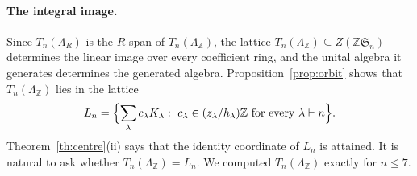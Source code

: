 \documentclass[11pt,a4paper]{article}
\theoremstyle{definition}
\newcommand{\Sn}{\mathfrak S}
\newcommand{\Z}{\mathbb Z}
\begin{document}
\paragraph{The integral image.} Since $T_n(\Lambda_R)$ is the $R$-span of $T_n(\Lambda_\Z)$, the lattice $T_n(\Lambda_\Z)\subseteq Z(\Z\Sn_n)$ determines the linear image over every coefficient ring, and the unital algebra it generates determines the generated algebra. Proposition~\ref{prop:orbit} shows that $T_n(\Lambda_\Z)$ lies in the lattice
\[
 L_n=\Bigl\{\sum_\lambda c_\lambda K_\lambda:\ c_\lambda\in(z_\lambda/h_\lambda)\Z\text{ for every }\lambda\vdash n\Bigr\}.
\]
Theorem~\ref{th:centre}(ii) says that the identity coordinate of $L_n$ is attained. It is natural to ask whether $T_n(\Lambda_\Z)=L_n$. We computed $T_n(\Lambda_\Z)$ exactly for $n\le7$.
\end{document}
